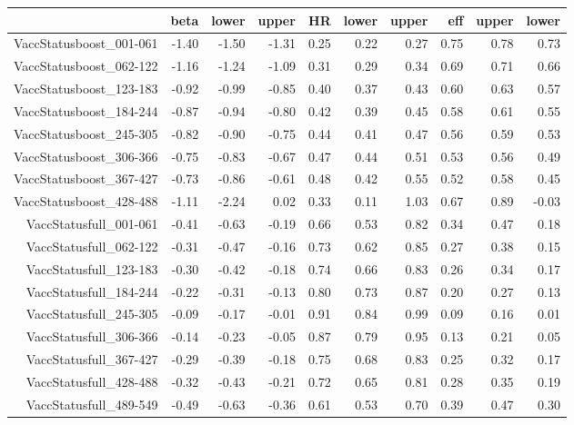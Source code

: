 \begin{table}[ht]
\centering
\begin{tabular}{rrrrrrrrrr}
  \hline
 & beta & lower & upper & HR & lower & upper & eff & upper & lower \\ 
  \hline
VaccStatusboost\_001-061 & -1.40 & -1.50 & -1.31 & 0.25 & 0.22 & 0.27 & 0.75 & 0.78 & 0.73 \\ 
  VaccStatusboost\_062-122 & -1.16 & -1.24 & -1.09 & 0.31 & 0.29 & 0.34 & 0.69 & 0.71 & 0.66 \\ 
  VaccStatusboost\_123-183 & -0.92 & -0.99 & -0.85 & 0.40 & 0.37 & 0.43 & 0.60 & 0.63 & 0.57 \\ 
  VaccStatusboost\_184-244 & -0.87 & -0.94 & -0.80 & 0.42 & 0.39 & 0.45 & 0.58 & 0.61 & 0.55 \\ 
  VaccStatusboost\_245-305 & -0.82 & -0.90 & -0.75 & 0.44 & 0.41 & 0.47 & 0.56 & 0.59 & 0.53 \\ 
  VaccStatusboost\_306-366 & -0.75 & -0.83 & -0.67 & 0.47 & 0.44 & 0.51 & 0.53 & 0.56 & 0.49 \\ 
  VaccStatusboost\_367-427 & -0.73 & -0.86 & -0.61 & 0.48 & 0.42 & 0.55 & 0.52 & 0.58 & 0.45 \\ 
  VaccStatusboost\_428-488 & -1.11 & -2.24 & 0.02 & 0.33 & 0.11 & 1.03 & 0.67 & 0.89 & -0.03 \\ 
  VaccStatusfull\_001-061 & -0.41 & -0.63 & -0.19 & 0.66 & 0.53 & 0.82 & 0.34 & 0.47 & 0.18 \\ 
  VaccStatusfull\_062-122 & -0.31 & -0.47 & -0.16 & 0.73 & 0.62 & 0.85 & 0.27 & 0.38 & 0.15 \\ 
  VaccStatusfull\_123-183 & -0.30 & -0.42 & -0.18 & 0.74 & 0.66 & 0.83 & 0.26 & 0.34 & 0.17 \\ 
  VaccStatusfull\_184-244 & -0.22 & -0.31 & -0.13 & 0.80 & 0.73 & 0.87 & 0.20 & 0.27 & 0.13 \\ 
  VaccStatusfull\_245-305 & -0.09 & -0.17 & -0.01 & 0.91 & 0.84 & 0.99 & 0.09 & 0.16 & 0.01 \\ 
  VaccStatusfull\_306-366 & -0.14 & -0.23 & -0.05 & 0.87 & 0.79 & 0.95 & 0.13 & 0.21 & 0.05 \\ 
  VaccStatusfull\_367-427 & -0.29 & -0.39 & -0.18 & 0.75 & 0.68 & 0.83 & 0.25 & 0.32 & 0.17 \\ 
  VaccStatusfull\_428-488 & -0.32 & -0.43 & -0.21 & 0.72 & 0.65 & 0.81 & 0.28 & 0.35 & 0.19 \\ 
  VaccStatusfull\_489-549 & -0.49 & -0.63 & -0.36 & 0.61 & 0.53 & 0.70 & 0.39 & 0.47 & 0.30 \\ 

\end{tabular}
\end{table}

